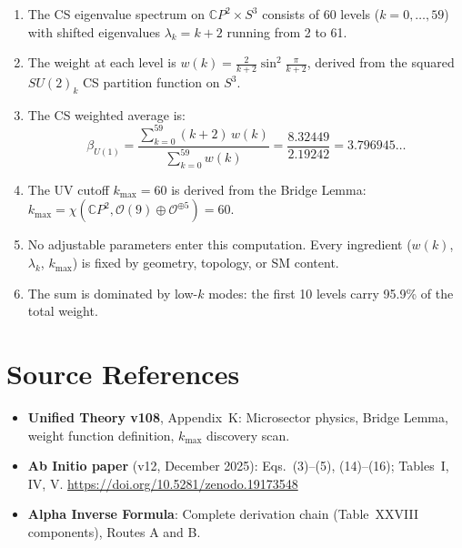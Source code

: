 \documentclass[12pt,a4paper]{article}
\begin{document}
\begin{enumerate}
\item The CS eigenvalue spectrum on $\mathbb{C}P^2 \times S^3$ consists
  of 60 levels ($k = 0, \ldots, 59$) with shifted eigenvalues
  $\lambda_k = k + 2$ running from 2 to 61.

\item The weight at each level is $w(k) = \frac{2}{k+2}\sin^2\frac{\pi}{k+2}$,
  derived from the squared $SU(2)_k$ CS partition function on $S^3$.

\item The CS weighted average is:
\[
\beta_{U(1)} = \frac{\sum_{k=0}^{59}(k+2)\,w(k)}{\sum_{k=0}^{59}w(k)}
= \frac{8.32449}{2.19242} = 3.796945\ldots
\]

\item The UV cutoff $k_{\max} = 60$ is derived from the Bridge Lemma:
  $k_{\max} = \chi(\mathbb{C}P^2, \mathcal{O}(9) \oplus \mathcal{O}^{\oplus 5}) = 60$.

\item No adjustable parameters enter this computation.  Every ingredient
  ($w(k)$, $\lambda_k$, $k_{\max}$) is fixed by geometry, topology, or
  SM content.

\item The sum is dominated by low-$k$ modes: the first 10 levels carry
  95.9\% of the total weight.
\end{enumerate}

\section*{Source References}

\begin{itemize}
\item \textbf{Unified Theory v108}, Appendix~K: Microsector physics,
  Bridge Lemma, weight function definition, $k_{\max}$ discovery scan.

\item \textbf{Ab Initio paper} (v12, December 2025): Eqs.~(3)--(5),
  (14)--(16); Tables~I, IV, V.
  \url{https://doi.org/10.5281/zenodo.19173548}

\item \textbf{Alpha Inverse Formula}: Complete derivation chain
  (Table~XXVIII components), Routes A and B.
\end{itemize}
\end{document}
